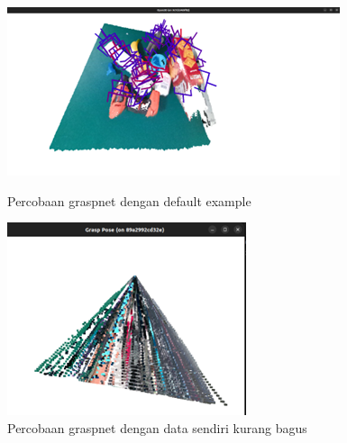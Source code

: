 \begin{figure}[h]
    \centering
    \begin{minipage}{0.44\columnwidth}
        \centering
        \includegraphics[width=\linewidth]{gambar/grasping default example.png}
        \caption{Percobaan graspnet dengan default example}
        \label{fig:graspnet_default_example}
    \end{minipage}
    \hfill
    \begin{minipage}{0.38\columnwidth}
        \centering
        \includegraphics[width=\linewidth]{gambar/graspnet self try.png}
        \caption{Percobaan graspnet dengan data sendiri kurang bagus}
        \label{fig:graspnet_self_try}
    \end{minipage}
\end{figure}


